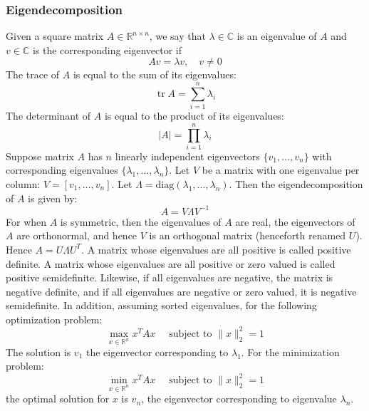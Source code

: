\documentclass[twoside,twocolumn]{article}
\begin{document}
\subsubsection{Eigendecomposition}
Given a square matrix $A \in \mathbb{R}^{n \times n}$, we say that
$\lambda \in \mathbb{C}$ is an eigenvalue of $A$ and $v \in \mathbb{C}$ is the
corresponding eigenvector if
\begin{equation}
  Av = \lambda v, \quad v \not= 0
\end{equation}
The trace of $A$ is equal to the sum of its eigenvalues:
\begin{equation}
  \operatorname{tr}A = \sum_{i=1}^n \lambda_i
\end{equation}
The determinant of $A$ is equal to the product of its eigenvalues:
\begin{equation}
  |A| = \prod_{i=1}^n \lambda_i
\end{equation}
Suppose matrix $A$ has $n$ linearly independent eigenvectors
$\{v_1, \hdots, v_n\}$ with corresponding eigenvalues
$\{\lambda_1, \hdots, \lambda_n\}$. Let $V$ be a matrix with one eigenvalue
per column: $V = \left[ v_1, \hdots, v_n \right]$. Let
$\Lambda =\textrm{diag}(\lambda_1,\hdots,\lambda_n)$. Then the eigendecomposition
of $A$ is given by:
\begin{equation}
  A = V \Lambda V^{-1}
\end{equation}
For when $A$ is symmetric, then the eigenvalues of $A$ are real, the
eigenvectors of $A$ are orthonormal, and hence $V$ is an orthogonal matrix
(henceforth renamed $U$). Hence $A = U \Lambda U^T$.
A matrix whose eigenvalues are all positive is called positive definite.
A matrix whose eigenvalues are all positive or zero valued is called positive
semidefinite. Likewise, if all eigenvalues are negative, the matrix is
negative definite, and if all eigenvalues are negative or zero valued,
it is negative semidefinite. In addition, assuming sorted eigenvalues,
for the following optimization problem:
\begin{equation}
  \max _ { x \in \mathbb { R } ^ { n } } x ^ { T } A x \quad \text { subject to } \| x \| _ { 2 } ^ { 2 } = 1
\end{equation}
The solution is $v_1$ the eigenvector corresponding to $\lambda_1$. For
the minimization problem:
\begin{equation}
  \min _ { x \in \mathbb { R } ^ { n } } x ^ { T } A x \quad \text { subject to } \| x \| _ { 2 } ^ { 2 } = 1
\end{equation}
the optimal solution for $x$ is $v_n$, the eigenvector corresponding to
eigenvalue $\lambda_n$.
\end{document}
